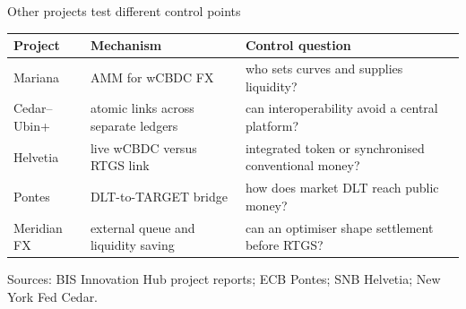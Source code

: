 \documentclass[aspectratio=169,12pt]{beamer}
\newcommand{\source}[1]{\vfill\par\fontsize{5.4}{6.5}\selectfont\color{Quiet}Sources: #1}
\begin{document}
\begin{frame}{Other projects test different control points}
  \fontsize{9.8}{11.8}\selectfont
  \begin{tabularx}{\textwidth}{L{1.95cm}Y Y}
    \toprule
    \textbf{Project} & \textbf{Mechanism} & \textbf{Control question} \\
    \midrule
    Mariana & AMM for wCBDC FX & who sets curves and supplies liquidity? \\
    Cedar--Ubin+ & atomic links across separate ledgers & can interoperability avoid a central platform? \\
    Helvetia & live wCBDC versus RTGS link & integrated token or synchronised conventional money? \\
    Pontes & DLT-to-TARGET bridge & how does market DLT reach public money? \\
    Meridian FX & external queue and liquidity saving & can an optimiser shape settlement before RTGS? \\
    \bottomrule
  \end{tabularx}
  \source{BIS Innovation Hub project reports; ECB Pontes; SNB Helvetia; New York Fed Cedar.}
\end{frame}
\end{document}
